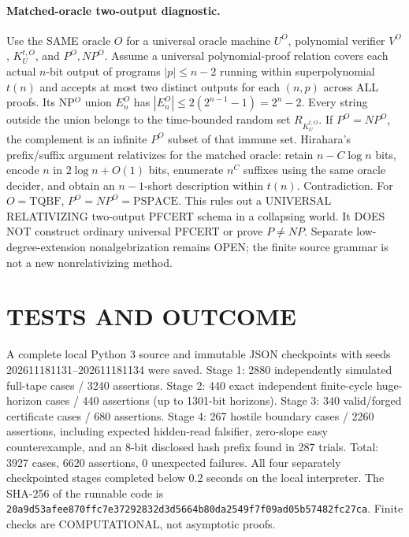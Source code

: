 \documentclass[11pt]{article}
\begin{document}
\paragraph{Matched-oracle two-output diagnostic.}
Use the SAME oracle $O$ for a universal oracle machine $U^O$, polynomial verifier $V^O$, $K_U^{t,O}$, and $P^O,NP^O$. Assume a universal polynomial-proof relation covers each actual $n$-bit output of programs $|p|\le n-2$ running within superpolynomial $t(n)$ and accepts at most two distinct outputs for each $(n,p)$ across ALL proofs. Its NP$^O$ union $E_n^O$ has $|E_n^O|\le2(2^{n-1}-1)=2^n-2$. Every string outside the union belongs to the time-bounded random set $R_{K_U^{t,O}}$. If $P^O=NP^O$, the complement is an infinite $P^O$ subset of that immune set. Hirahara's prefix/suffix argument relativizes for the matched oracle: retain $n-C\log n$ bits, encode $n$ in $2\log n+O(1)$ bits, enumerate $n^C$ suffixes using the same oracle decider, and obtain an $n-1$-short description within $t(n)$. Contradiction. For $O=\mathrm{TQBF}$, $P^O=NP^O=\mathrm{PSPACE}$. This rules out a UNIVERSAL RELATIVIZING two-output PFCERT schema in a collapsing world. It DOES NOT construct ordinary universal PFCERT or prove $P\ne NP$. Separate low-degree-extension nonalgebrization remains OPEN; the finite source grammar is not a new nonrelativizing method.

\section{TESTS AND OUTCOME}
A complete local Python 3 source and immutable JSON checkpoints with seeds 202611181131--202611181134 were saved. Stage 1: 2880 independently simulated full-tape cases / 3240 assertions. Stage 2: 440 exact independent finite-cycle huge-horizon cases / 440 assertions (up to 1301-bit horizons). Stage 3: 340 valid/forged certificate cases / 680 assertions. Stage 4: 267 hostile boundary cases / 2260 assertions, including expected hidden-read falsifier, zero-slope easy counterexample, and an 8-bit disclosed hash prefix found in 287 trials. Total: 3927 cases, 6620 assertions, 0 unexpected failures. All four separately checkpointed stages completed below 0.2 seconds on the local interpreter. The SHA-256 of the runnable code is \texttt{20a9d53afee870ffc7e37292832d3d5664b80da2549f7f09ad05b57482fc27ca}. Finite checks are COMPUTATIONAL, not asymptotic proofs.
\end{document}
